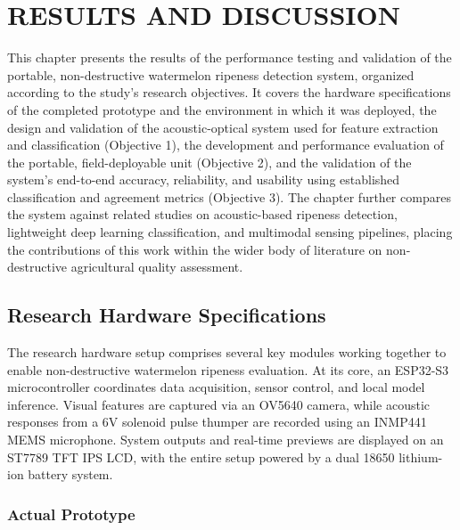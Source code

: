 \chapter{RESULTS AND DISCUSSION}

\begin{thesisprose}

This chapter presents the results of the performance testing and validation of the portable, non-destructive watermelon ripeness detection system, organized according to the study's research objectives. It covers the hardware specifications of the completed prototype and the environment in which it was deployed, the design and validation of the acoustic-optical system used for feature extraction and classification (Objective 1), the development and performance evaluation of the portable, field-deployable unit (Objective 2), and the validation of the system's end-to-end accuracy, reliability, and usability using established classification and agreement metrics (Objective 3). The chapter further compares the system against related studies on acoustic-based ripeness detection, lightweight deep learning classification, and multimodal sensing pipelines, placing the contributions of this work within the wider body of literature on non-destructive agricultural quality assessment.

\section{Research Hardware Specifications}

The research hardware setup comprises several key modules working together to enable non-destructive watermelon ripeness evaluation. At its core, an ESP32-S3 microcontroller coordinates data acquisition, sensor control, and local model inference. Visual features are captured via an OV5640 camera, while acoustic responses from a 6V solenoid pulse thumper are recorded using an INMP441 MEMS microphone. System outputs and real-time previews are displayed on an ST7789 TFT IPS LCD, with the entire setup powered by a dual 18650 lithium-ion battery system.

\subsection{Actual Prototype}


\end{thesisprose}
